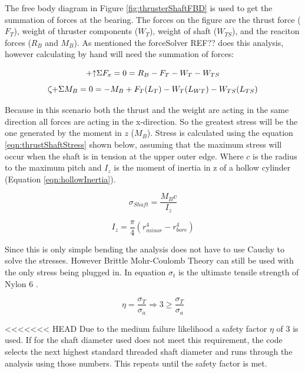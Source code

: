 \documentclass[../main.tex]{subfiles}
\begin{document}
The free body diagram in Figure \ref{fig:thrusterShaftFBD}  is used to get the summation of forces at the bearing. The forces on the figure are the thrust force ($F_T$), weight of thruster components ($W_T$), weight of shaft ($W_{TS}$), and the reaciton forces ($R_B$ and $M_B$). As mentioned the forceSolver REF?? does this analysis, however calculating by hand will need the summation of forces:

\begin{equation}
\label{eqn:thrustShaftFx} 
\mathbin{+\mathord\uparrow} \Sigma F_x  = 0 = R_B - F_T - W_T - W_{TS}
\end{equation}
\begin{equation}
\label{eqn:thrustShaftFx} 
\curveplus \Sigma M_B = 0 = -M_B + F_T(L_T) - W_T(L_{WT}) - W_{TS}(L_{TS})
\end{equation}

Because in this scenario both the thrust and the weight are acting in the same direction all forces are acting in the x-direction. So the greatest stress will be the one generated by the moment in $z$ ($M_B$). Stress is calculated using the equation \ref{eqn:thrustShaftStress} shown below, assuming that the maximum stress will occur when the shaft is in tension at the upper outer edge. Where $c$ is the radius to the maximum pitch and $I_z$ is the moment of inertia in z of a hollow cylinder (Equation \ref{eqn:hollowInertia}).

\begin{equation}
\label{eqn:thrustShaftStress} 
\sigma _{Shaft}  = \dfrac{M_{B}c}{I_z} 
\end{equation}

\begin{equation}
\label{eqn:hollowInertia} 
I _{z}  = \dfrac{\pi}{4} (r_{minor}^4 - r_{bore}^4)
\end{equation}

Since this is only simple bending the analysis does not have to use Cauchy to solve the stresses. However Brittle Mohr-Coulomb Theory \cite[227]{shigley} can still be used with the only stress being plugged in. In equation $\sigma_{t}$ is the ultimate tensile strength of Nylon 6 \cite{Nylon6}.

\begin{equation}
\eta = \dfrac{\sigma_{T}}{\sigma _a} \Rightarrow 3 \geq \dfrac{\sigma_{T}}{\sigma _a}
\end{equation}

<<<<<<< HEAD
Due to the medium failure likelihood a safety factor $\eta$ of 3 is used. If for the shaft diameter used does not meet this requirement, the code selects the next highest standard threaded shaft diameter and runs through the analysis using those numbers. This repeats until the safety factor is met. 
\end{document}
